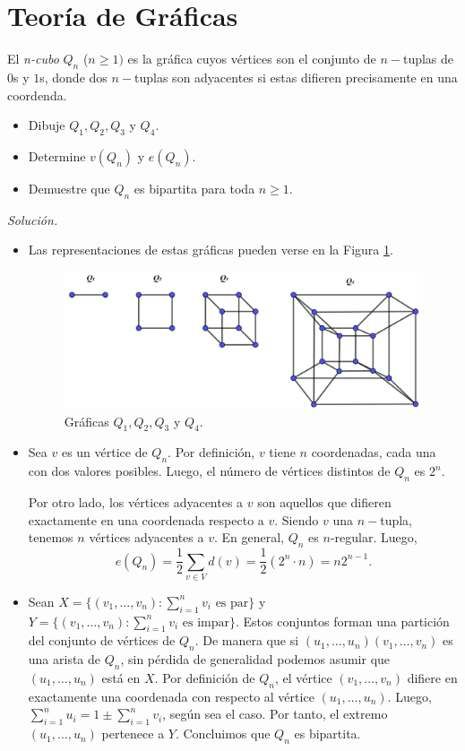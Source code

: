 \documentclass[12pt]{article}
\newenvironment{problem}[2][Problema]{\begin{trivlist}
\item[\hskip \labelsep {\bfseries #1}\hskip \labelsep {\bfseries #2.}]}{\end{trivlist}}
\begin{document}
\section*{Teoría de Gráficas}

\begin{problem}{1.1.7} El \textit{n-cubo} $Q_n$ ($n\geq 1)$ es la gráfica cuyos vértices son el conjunto de $n-$tuplas de $0$s y $1$s, donde dos $n-$tuplas son adyacentes si estas difieren precisamente en una coordenda.
\begin{itemize}
    \item[a)] Dibuje $Q_1, Q_2, Q_3$ y $Q_4.$
    \item[b)] Determine $v(Q_n)$ y $e(Q_n).$
    \item[c)] Demuestre que $Q_n$ es bipartita para toda $n\geq 1.$
\end{itemize}
\end{problem}
\textit{Solución.}
\begin{itemize}
    \item[a)] Las representaciones de estas gráficas pueden verse en la Figura \ref{fig:fig4}.
    
    \begin{figure}[h]
        \centering
        \includegraphics[scale=0.45]{pics/graph2.png}
        \caption{Gráficas $Q_1, Q_2, Q_3$ y $Q_4.$}
        \label{fig:fig4}
    \end{figure}
    \item[b)] Sea $v$ es un vértice de $Q_n$. Por definición, $v$ tiene $n$ coordenadas, cada una con dos valores posibles. Luego, el número de vértices distintos de $Q_n$ es $2^n.$
    
    Por otro lado, los vértices adyacentes a $v$ son aquellos que difieren exactamente en una coordenada respecto a $v$. Siendo $v$ una $n-$tupla, tenemos $n$ vértices adyacentes a $v.$ En general, $Q_n$ es $n$-regular. Luego,
    $$e(Q_n) = \frac{1}{2} \sum_{v \in V} d(v) = \frac{1}{2} \left(2^n \cdot n\right) = n 2^{n-1}.$$
    \item[c)] Sean $X = \{(v_1,\ldots, v_n): \sum_{i=1}^n v_i \text{ es par}\}$ y $Y = \{(v_1,\ldots, v_n): \sum_{i=1}^n v_i \text{ es impar}\}$. Estos conjuntos forman una partición del conjunto de vértices de $Q_n.$ De manera que si $(u_1,\ldots,u_n)(v_1,\ldots, v_n)$ es una arista de $Q_n$, sin pérdida de generalidad podemos asumir que $(u_1,\ldots,u_n)$ está en $X.$ Por definición de $Q_n$, el vértice $(v_1, \ldots, v_n)$ difiere en exactamente una coordenada con respecto al vértice $(u_1,\ldots, u_n).$ Luego, $ \sum_{i=1}^n u_i = 1 \pm \sum_{i=1}^n v_i$, según sea el caso. Por tanto, el extremo $(u_1,\ldots, u_n)$ pertenece a $Y$. Concluimos que $Q_n$ es bipartita.
\end{itemize}
\end{document}
